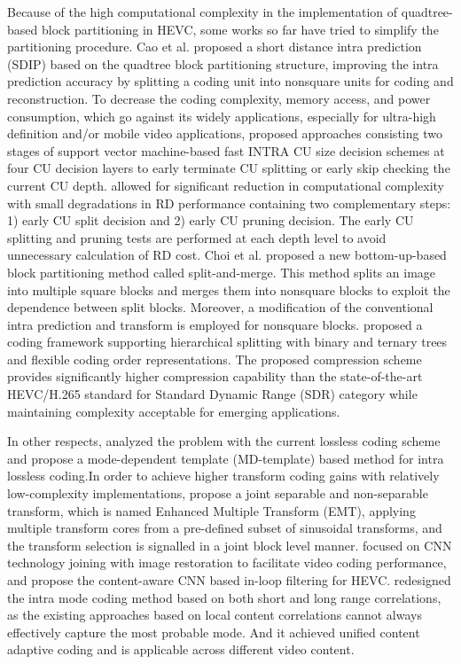 \documentclass[journal]{IEEEtran}
\begin{document}
Because of the high computational complexity in the implementation of quadtree-based block partitioning in HEVC, some works so far have tried to simplify the partitioning procedure. Cao et al. \cite{20} proposed a short distance intra prediction (SDIP) based on the quadtree block partitioning structure, improving the intra prediction accuracy by splitting a coding unit into nonsquare units for coding and reconstruction. To decrease the coding complexity, memory access, and power consumption, which go against its widely applications, especially for ultra-high definition and/or mobile video applications, \cite{21} proposed approaches consisting two stages of support vector machine-based fast INTRA CU size decision schemes at four CU decision layers to early terminate CU splitting or early skip checking the current CU depth. \cite{22} allowed for significant reduction in computational complexity with small degradations in RD performance containing two complementary steps: 1) early CU split decision and 2) early CU pruning decision. The early CU splitting and pruning tests are performed at each depth level to avoid unnecessary calculation of RD cost. Choi et al. \cite{23} proposed a new bottom-up-based block partitioning method called split-and-merge. This method splits an image into multiple square blocks and merges them into nonsquare blocks to exploit the dependence between split blocks. Moreover, a modification of the conventional intra prediction and transform is employed for nonsquare blocks. \cite{24} proposed a coding framework supporting hierarchical splitting with binary and ternary trees and flexible coding order representations. The proposed compression scheme provides significantly higher compression capability than the state-of-the-art HEVC/H.265 standard for Standard Dynamic Range (SDR) category while maintaining complexity acceptable for emerging applications.

In other respects, \cite{25} analyzed the problem with the current lossless coding scheme and propose a mode-dependent template (MD-template) based method for intra lossless coding.In order to achieve higher transform coding gains with relatively low-complexity implementations, \cite{26} propose a joint separable and non-separable transform, which is named Enhanced Multiple Transform (EMT), applying multiple transform cores from a pre-defined subset of sinusoidal transforms, and the transform selection is signalled in a joint block level manner. \cite{27} focused on CNN technology joining with image restoration to facilitate video
coding performance, and propose the content-aware CNN based in-loop filtering for HEVC. \cite{28} redesigned the intra mode coding method based on both short and long range correlations, as the existing approaches based on local content correlations cannot always effectively capture the most probable mode. And it achieved unified content adaptive coding and is applicable across different video content.
\end{document}
